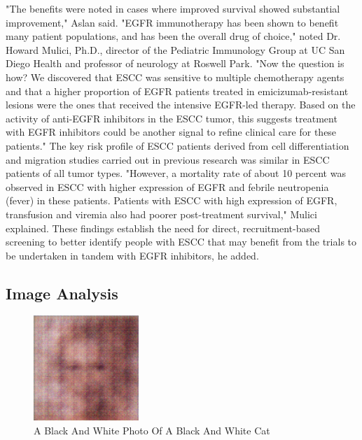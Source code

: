 \documentclass{article}%
\begin{document}
"The benefits were noted in cases where improved survival showed substantial improvement," Aslan said.\newline%
"EGFR immunotherapy has been shown to benefit many patient populations, and has been the overall drug of choice," noted Dr. Howard Mulici, Ph.D., director of the Pediatric Immunology Group at UC San Diego Health and professor of neurology at Roswell Park. "Now the question is how? We discovered that ESCC was sensitive to multiple chemotherapy agents and that a higher proportion of EGFR patients treated in emicizumab{-}resistant lesions were the ones that received the intensive EGFR{-}led therapy. Based on the activity of anti{-}EGFR inhibitors in the ESCC tumor, this suggests treatment with EGFR inhibitors could be another signal to refine clinical care for these patients."\newline%
The key risk profile of ESCC patients derived from cell differentiation and migration studies carried out in previous research was similar in ESCC patients of all tumor types. "However, a mortality rate of about 10 percent was observed in ESCC with higher expression of EGFR and febrile neutropenia (fever) in these patients. Patients with ESCC with high expression of EGFR, transfusion and viremia also had poorer post{-}treatment survival," Mulici explained.\newline%
These findings establish the need for direct, recruitment{-}based screening to better identify people with ESCC that may benefit from the trials to be undertaken in tandem with EGFR inhibitors, he added.

%
\subsection{Image Analysis}%
\label{subsec:ImageAnalysis}%


\begin{figure}[h!]%
\centering%
\includegraphics[width=150px]{500_fake_images/samples_5_296.png}%
\caption{A Black And White Photo Of A Black And White Cat}%
\end{figure}

%
\end{document}
